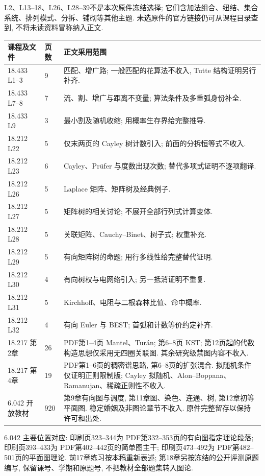 L2、L13--18、L26、L28--39不是本次原件冻结选择; 它们含加法组合、纽结、集合系统、排列模式、分拆、铺砌等其他主题. 未选原件的官方链接仍可从课程目录查到, 不将未读资料冒称纳入正文.
\begin{longtable}{p{33mm}p{12mm}p{110mm}}
\toprule
课程及文件 & 页数 & 正文采用范围\\\midrule\endhead
18.433 L1--3 & 9 & 匹配、增广路; 一般匹配的花算法不收入, Tutte 结构证明另行补齐.\\
18.433 L7--8 & 7 & 流、割、增广与距离不变量; 算法条件及多重弧身份补全.\\
18.433 L9 & 3 & 最小割及随机收缩; 用概率生存界给完整推导.\\
18.212 L22 & 5 & 仅末两页的 Cayley 树计数引入; 前面的分拆恒等式不收入.\\
18.212 L23 & 6 & Cayley、Prüfer 与度数出现次数; 替代多项式证明不逐项翻译.\\
18.212 L26 & 5 & Laplace 矩阵、矩阵树及经典例子.\\
18.212 L27 & 5 & 矩阵树的相关讨论; 不展开全部行列式计算变体.\\
18.212 L28 & 5 & 关联矩阵、Cauchy--Binet、树子式; 权重补充.\\
18.212 L29 & 5 & 有向矩阵树的命题; 用行多线性给完整替代证明.\\
18.212 L30 & 4 & 有向树权与电网络引入; 另一抵消证明不重复.\\
18.212 L31 & 5 & Kirchhoff、电阻与二根森林比值、命中概率.\\
18.212 L32 & 4 & 有向 Euler 与 BEST; 首弧和计数等价约定补齐.\\
18.217 第2章 & 26 & PDF第1--4页 Mantel、Turán; 第6--8页 KST; 第12页起的代数构造思想仅采用无四圈关联图. 其余研究级禁图内容不收入.\\
18.217 第4章 & 19 & PDF第1--6页的稠密谱思路, 第6--8页的扩张混合. 拟随机条件仅证明正则限制版; Cayley 拟随机、Alon--Boppana、Ramanujan、稀疏正则性不收入.\\
6.042 开放教材 & 920 & 第9章有向图与调度, 第11章图、染色、连通、树, 第12章初等平面图. 稳定婚姻及非图论章节不收入. 原件完整留存以保持许可和出处.\\\bottomrule
\end{longtable}
6.042 主要位置对应: 印刷页323--344为 PDF第332--353页的有向图指定理论段落; 印刷页393--433为 PDF第402--442页的简单图主干; 印刷页473--492为 PDF第482--501页的平面图理论. 前17章练习按本稿重新表述; 第18章另按冻结的公开评测原题编写, 保留课号、学期和原题号, 不把教材全部题集转入图论.
